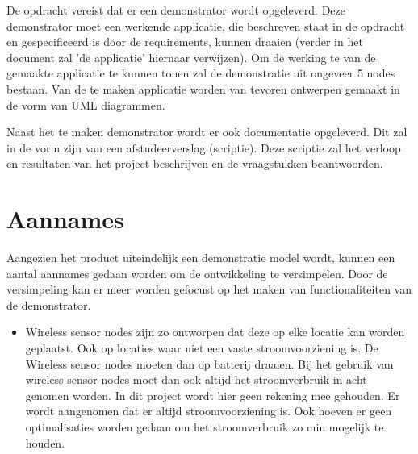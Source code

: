 \documentclass{../local}
\begin{document}
De opdracht vereist dat er een demonstrator wordt opgeleverd. Deze demonstrator moet een werkende applicatie, die beschreven staat in de opdracht en gespecificeerd is door de requirements, kunnen draaien (verder in het document zal 'de applicatie' hiernaar verwijzen). Om de werking te van de gemaakte applicatie te kunnen tonen zal de demonstratie uit ongeveer 5 nodes bestaan. Van de te maken applicatie worden van tevoren ontwerpen gemaakt in de vorm van UML diagrammen.

Naast het te maken demonstrator wordt er ook documentatie opgeleverd. Dit zal in de vorm zijn van een afstudeerverslag (scriptie). Deze scriptie zal het verloop en resultaten van het project beschrijven en de vraagstukken beantwoorden.

\section{Aannames}
Aangezien het product uiteindelijk een demonstratie model wordt, kunnen een aantal aannames gedaan worden om de ontwikkeling te versimpelen. Door de versimpeling kan er meer worden gefocust op het maken van functionaliteiten van de demonstrator.

\begin{itemize}
\item Wireless sensor nodes zijn zo ontworpen dat deze op elke locatie kan worden geplaatst. Ook op locaties waar niet een vaste stroomvoorziening is. De Wireless sensor nodes moeten dan op batterij draaien. Bij het gebruik van wireless sensor nodes moet dan ook altijd het stroomverbruik in acht genomen worden. In dit project wordt hier geen rekening mee gehouden. Er wordt aangenomen dat er altijd stroomvoorziening is. Ook hoeven er geen optimalisaties worden gedaan om het stroomverbruik zo min mogelijk te houden.
\end{itemize}
\end{document}

